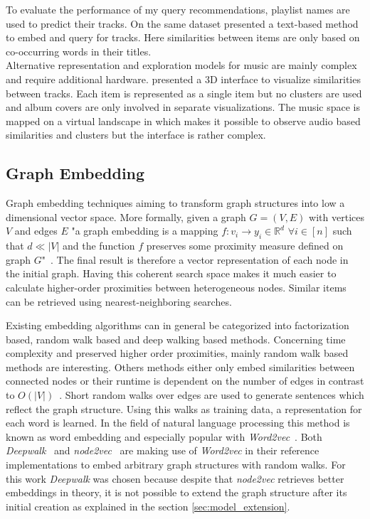 \documentclass[sigconf]{acmart}
\begin{document}
To evaluate the performance of my query recommendations, playlist names are used to predict their tracks. On the same dataset \cite{chungexploiting} presented a text-based method to embed and query for tracks. Here similarities between items are only based on co-occurring words in their titles. \\

Alternative representation and exploration models for music are mainly complex and require additional hardware. \cite{lamere2007using} presented a 3D interface to visualize similarities between tracks. Each item is represented as a single item but no clusters are used and album covers are only involved in separate visualizations. The music space is mapped on a virtual landscape in \cite{knees2007exploring} which makes it possible to observe audio based similarities and clusters but the interface is rather complex.

\subsection{Graph Embedding}
Graph embedding techniques aiming to transform graph structures into low a dimensional vector space. More formally, given a graph $ G = (V,E) $ with vertices $ V $ and edges $ E $ "a graph embedding is a mapping $ f : v_{i} \rightarrow y_{i} \in \mathbb{R}^{d} $ $ \forall i \in [n] $ such that $ d \ll |V| $ and the function $ f $ preserves some proximity measure defined on graph $ G $"~\cite{goyal2017graph}. The final result is therefore a vector representation of each node in the initial graph. Having this coherent search space makes it much easier to calculate higher-order proximities between heterogeneous nodes. Similar items can be retrieved using nearest-neighboring searches.

Existing embedding algorithms can in general be categorized into factorization based, random walk based and deep walking based methods. Concerning time complexity and preserved higher order proximities, mainly random walk based methods are interesting. Others methods either only embed similarities between connected nodes or their runtime is dependent on the number of edges in contrast to $ O(|V|) $~\cite{goyal2017graph}. Short random walks over edges are used to generate sentences which reflect the graph structure. Using this walks as training data, a representation for each word is learned. In the field of natural language processing this method is known as word embedding and especially popular with \emph{Word2vec}~\cite{mikolov2013efficient}. Both \emph{Deepwalk}~\cite{perozzi2014deepwalk} and \emph{node2vec}~\cite{grover2016node2vec} are making use of \emph{Word2vec} in their reference implementations to embed arbitrary graph structures with random walks. For this work \emph{Deepwalk} was chosen because despite that \emph{node2vec} retrieves better embeddings in theory, it is not possible to extend the graph structure after its initial creation as explained in the section \ref{sec:model_extension}.
\end{document}

